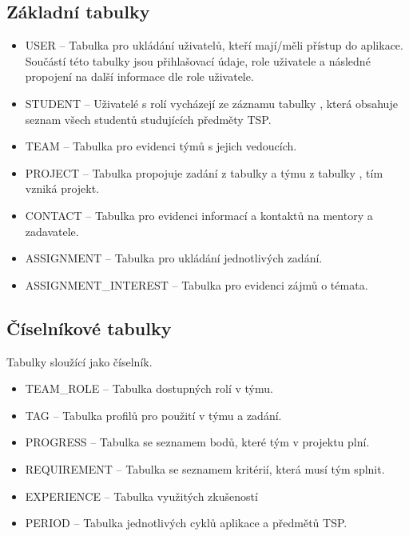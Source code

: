 \documentclass[czech,BP]{thesiskiv}
\begin{document}
		\subsection{Základní tabulky}
			\begin{itemize}
				\item USER -- Tabulka pro ukládání uživatelů, kteří mají/měli přístup do aplikace. Součástí této tabulky jsou přihlašovací údaje, role uživatele a následné propojení na další informace dle role uživatele.
				\item STUDENT -- Uživatelé s rolí  vycházejí ze záznamu tabulky , která obsahuje seznam všech studentů studujících předměty TSP.
				\item TEAM -- Tabulka pro evidenci týmů s jejich vedoucích.
				\item PROJECT -- Tabulka propojuje zadání z tabulky  a týmu z tabulky , tím vzniká projekt.
				\item CONTACT -- Tabulka pro evidenci informací a kontaktů na mentory a zadavatele.
				\item ASSIGNMENT -- Tabulka pro ukládání jednotlivých zadání.
				\item ASSIGNMENT\_INTEREST -- Tabulka pro evidenci zájmů o témata.
			\end{itemize}
		\subsection{Číselníkové tabulky}
		\par Tabulky sloužící jako číselník.
		\begin{itemize}
			\item TEAM\_ROLE -- Tabulka dostupných rolí v týmu.
			\item TAG -- Tabulka profilů pro použití v týmu a zadání.
			\item PROGRESS -- Tabulka se seznamem bodů, které tým v projektu plní.
			\item REQUIREMENT -- Tabulka se seznamem kritérií, která musí tým splnit.
			\item EXPERIENCE -- Tabulka využitých zkušeností
			\item PERIOD -- Tabulka jednotlivých cyklů aplikace a předmětů TSP.
		\end{itemize}
\end{document}
